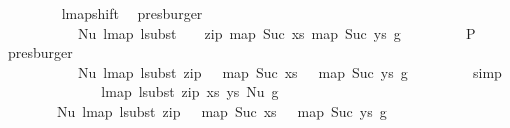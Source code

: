 \begin{isabellebody}
\ \ \ \ \ \ \ \isamarkupfalse%
\ lmap{\isacharunderscore}{\kern0pt}shift{}\ \isamarkupfalse%
\ presburger\isanewline
\ \ \ \ \ \isamarkupfalse%
\ \isamarkupfalse%
\ {\isachardoublequoteopen}{\isachardot}{\kern0pt}{\isachardot}{\kern0pt}{\isachardot}{\kern0pt}\ {\isacharequal}{\kern0pt}\isanewline
\ \ \ \ \ \ \ \ \ \ \ Nu\ {\isacharparenleft}{\kern0pt}lmap\ {\isacharparenleft}{\kern0pt}lsubst\ {\isacharparenleft}{\kern0pt}{\isacharparenleft}{\kern0pt}{}{\isacharcomma}{\kern0pt}\ {}{\isacharparenright}{\kern0pt}\ {\isacharhash}{\kern0pt}\ zip\ {\isacharparenleft}{\kern0pt}map\ Suc\ xs{\isacharparenright}{\kern0pt}\ {\isacharparenleft}{\kern0pt}map\ Suc\ ys{\isacharparenright}{\kern0pt}{\isacharparenright}{\kern0pt}{\isacharparenright}{\kern0pt}\ g{\isacharparenright}{\kern0pt}{\isachardoublequoteclose}\isanewline
\ \ \ \ \ \ \ \isamarkupfalse%
\ P{}\ \isamarkupfalse%
\ presburger\isanewline
\ \ \ \ \ \isamarkupfalse%
\ \isamarkupfalse%
\ {\isachardoublequoteopen}{\isachardot}{\kern0pt}{\isachardot}{\kern0pt}{\isachardot}{\kern0pt}\ {\isacharequal}{\kern0pt}\isanewline
\ \ \ \ \ \ \ \ \ \ \ Nu\ {\isacharparenleft}{\kern0pt}lmap\ {\isacharparenleft}{\kern0pt}lsubst\ {\isacharparenleft}{\kern0pt}zip\ {\isacharparenleft}{\kern0pt}{}\ {\isacharhash}{\kern0pt}\ map\ Suc\ xs{\isacharparenright}{\kern0pt}\ {\isacharparenleft}{\kern0pt}{}\ {\isacharhash}{\kern0pt}\ map\ Suc\ ys{\isacharparenright}{\kern0pt}{\isacharparenright}{\kern0pt}{\isacharparenright}{\kern0pt}\ g{\isacharparenright}{\kern0pt}{\isachardoublequoteclose}\isanewline
\ \ \ \ \ \ \ \isamarkupfalse%
\ simp\isanewline
\ \ \ \ \ \isamarkupfalse%
\ \isamarkupfalse%
\isanewline
\ \ \ \ \ \ \ {\isachardoublequoteopen}lmap\ {\isacharparenleft}{\kern0pt}lsubst\ {\isacharparenleft}{\kern0pt}zip\ xs\ ys{\isacharparenright}{\kern0pt}{\isacharparenright}{\kern0pt}\ {\isacharparenleft}{\kern0pt}Nu\ g{\isacharparenright}{\kern0pt}\ {\isacharequal}{\kern0pt}\isanewline
\ \ \ \ \ \ \ \ Nu\ {\isacharparenleft}{\kern0pt}lmap\ {\isacharparenleft}{\kern0pt}lsubst\ {\isacharparenleft}{\kern0pt}zip\ {\isacharparenleft}{\kern0pt}{}\ {\isacharhash}{\kern0pt}\ map\ Suc\ xs{\isacharparenright}{\kern0pt}\ {\isacharparenleft}{\kern0pt}{}\ {\isacharhash}{\kern0pt}\ map\ Suc\ ys{\isacharparenright}{\kern0pt}{\isacharparenright}{\kern0pt}{\isacharparenright}{\kern0pt}\ g{\isacharparenright}{\kern0pt}{\isachardoublequoteclose}\ \isakeywordONE{{\isachardot}{\kern0pt}}\isamarkupfalse%

\end{isabellebody}
